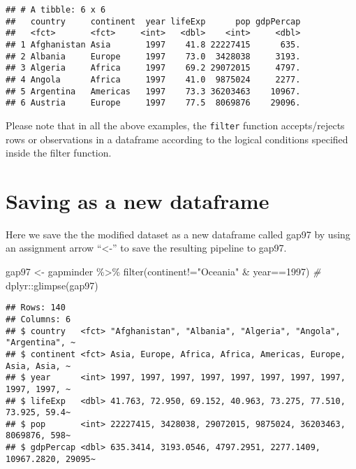 \documentclass[
]{book}
\newenvironment{Shaded}{\begin{snugshade}}{\end{snugshade}}
\newcommand{\CommentTok}[1]{\textcolor[rgb]{0.56,0.35,0.01}{\textit{#1}}}
\newcommand{\DecValTok}[1]{\textcolor[rgb]{0.00,0.00,0.81}{#1}}
\newcommand{\FunctionTok}[1]{\textcolor[rgb]{0.00,0.00,0.00}{#1}}
\newcommand{\NormalTok}[1]{#1}
\newcommand{\OtherTok}[1]{\textcolor[rgb]{0.56,0.35,0.01}{#1}}
\newcommand{\SpecialCharTok}[1]{\textcolor[rgb]{0.00,0.00,0.00}{#1}}
\newcommand{\StringTok}[1]{\textcolor[rgb]{0.31,0.60,0.02}{#1}}
\begin{document}
\begin{verbatim}
## # A tibble: 6 x 6
##   country     continent  year lifeExp      pop gdpPercap
##   <fct>       <fct>     <int>   <dbl>    <int>     <dbl>
## 1 Afghanistan Asia       1997    41.8 22227415      635.
## 2 Albania     Europe     1997    73.0  3428038     3193.
## 3 Algeria     Africa     1997    69.2 29072015     4797.
## 4 Angola      Africa     1997    41.0  9875024     2277.
## 5 Argentina   Americas   1997    73.3 36203463    10967.
## 6 Austria     Europe     1997    77.5  8069876    29096.
\end{verbatim}

Please note that in all the above examples, the \texttt{filter} function accepts/rejects rows or observations in a dataframe according to the logical conditions specified inside the filter function.

\hypertarget{saving-as-a-new-dataframe}{%
\section{Saving as a new dataframe}\label{saving-as-a-new-dataframe}}

Here we save the the modified dataset as a new dataframe called gap97 by using an assignment arrow ``\textless-'' to save the resulting pipeline to gap97.

\begin{Shaded}
\begin{Highlighting}[]
\NormalTok{gap97 }\OtherTok{\textless{}{-}}\NormalTok{ gapminder }\SpecialCharTok{\%\textgreater{}\%} 
  \FunctionTok{filter}\NormalTok{(continent}\SpecialCharTok{!=}\StringTok{"Oceania"} \SpecialCharTok{\&}\NormalTok{ year}\SpecialCharTok{==}\DecValTok{1997}\NormalTok{) }
\CommentTok{\#}
\NormalTok{dplyr}\SpecialCharTok{::}\FunctionTok{glimpse}\NormalTok{(gap97)}
\end{Highlighting}
\end{Shaded}

\begin{verbatim}
## Rows: 140
## Columns: 6
## $ country   <fct> "Afghanistan", "Albania", "Algeria", "Angola", "Argentina", ~
## $ continent <fct> Asia, Europe, Africa, Africa, Americas, Europe, Asia, Asia, ~
## $ year      <int> 1997, 1997, 1997, 1997, 1997, 1997, 1997, 1997, 1997, 1997, ~
## $ lifeExp   <dbl> 41.763, 72.950, 69.152, 40.963, 73.275, 77.510, 73.925, 59.4~
## $ pop       <int> 22227415, 3428038, 29072015, 9875024, 36203463, 8069876, 598~
## $ gdpPercap <dbl> 635.3414, 3193.0546, 4797.2951, 2277.1409, 10967.2820, 29095~
\end{verbatim}
\end{document}
